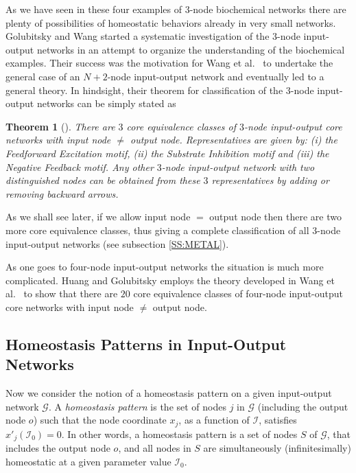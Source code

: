 \documentclass[a4paper,fleqn]{cas-dc}
\newcommand{\II}{{\mathcal I}}
\newtheorem{theorem}{Theorem}[section]
\newcommand{\etal}{\textrm{et al.}}
\begin{document}
As we have seen in these four examples of $3$-node biochemical networks there are plenty of possibilities of homeostatic behaviors already in very small networks.
Golubitsky and Wang \cite{wang2020} started a systematic investigation of the $3$-node input-output networks in an attempt to organize the understanding of the biochemical examples.
Their success was the motivation for Wang \etal~\cite{wang2021} to undertake the general case of an $N+2$-node input-output network and eventually led to a general theory.
In hindsight, their theorem for classification of the $3$-node input-output networks can be simply stated as

\begin{theorem}[{\cite{wang2020,wang2021}}]
\label{thm:class_3_node_core_i_o}
There are $3$ core equivalence clas\-ses of $3$-node input-output core networks with input node $\neq$ output node.
Representatives are given by: (i) the Feedforward Excitation motif, (ii) the Substrate Inhibition motif and (iii) the Negative Feedback motif.
Any other $3$-node input-output network with two distinguished nodes can be obtained from these $3$ representatives by adding or removing backward arrows.
\end{theorem}

As we shall see later, if we allow input node $=$ output node then there are two more core equivalence classes, thus giving a complete classification of all $3$-node input-output networks (see subsection \ref{SS:METAL}).

As one goes to four-node input-output networks the situation is much more complicated.
Huang and Golubitsky \cite{huang2022} employs the theory developed in Wang \etal~\cite{wang2021} to show that there are $20$ core equivalence classes of four-node input-output core networks with input node $\neq$ output node.

\subsection{Homeostasis Patterns in Input-Output Networks}

Now we consider the notion of a homeostasis pattern on a given input-output network $\mathcal{G}$.  
A {\em homeostasis pattern} is the set of nodes $j$ in $\mathcal{G}$ (including the output node $o$) such that the node coordinate $x_j$, as a function of $\II$, satisfies $x'_j(\II_0) = 0$.  
In other words, a homeostasis pattern is a set of nodes $S$ of $\mathcal{G}$, that includes the output node $o$, and all nodes in $S$ are simultaneously (infinitesimally) homeostatic at a given parameter value $\II_0$.  
 
\end{document}
